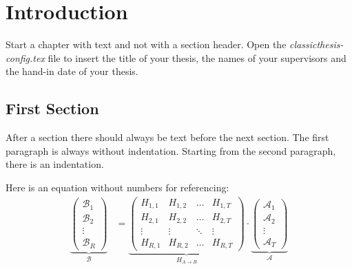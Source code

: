 
\chapter{Introduction}\label{ch:introduction}
\glsresetall %

Start a chapter with text and not with a section header. Open the
\emph{classicthesis-config.tex} file to insert the title of your thesis, the
names of your supervisors and the hand-in date of your thesis.

\section{First Section}
\label{sec:first_section}

After a section there should always be text before the next section. The first
paragraph is always without indentation. Starting from the second paragraph,
there is an indentation.

Here is an equation without numbers for referencing:
\begin{align*}
\underbrace{\begin{pmatrix}\mathcal{B}_1\\\mathcal{B}_2\\\vdots\\\mathcal{B}_R\end{pmatrix}}_\mathcal{B} &= \underbrace{\begin{pmatrix}H_{1,1} & H_{1,2} & \hdots & H_{1,T}\\H_{2,1} & H_{2,2} & \hdots & H_{2,T}\\\vdots & \vdots & \ddots & \vdots\\H_{R,1} & H_{R,2} & \hdots & H_{R,T}\end{pmatrix}}_{H_{A\rightarrow B}}\cdot \underbrace{\begin{pmatrix}\mathcal{A}_1\\\mathcal{A}_2\\\vdots\\\mathcal{A}_T\end{pmatrix}}_\mathcal{A}
\end{align*}

